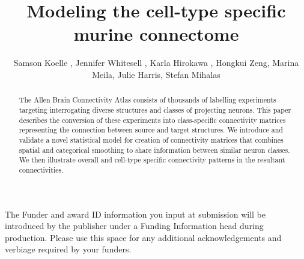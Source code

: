 \documentclass[NETN,manuscript]{stjour-new}
\begin{document}



\title{Modeling the cell-type specific murine connectome}

\author[Koelle et al]%
{Samson Koelle , Jennifer Whitesell , Karla Hirokawa ,  Hongkui Zeng, Marina Meila, Julie Harris, Stefan Mihalas}





\begin{abstract}

The Allen Brain Connectivity Atlas consists of thousands of labelling experiments targeting interrogating diverse structures and classes of projecting neurons.
This paper describes the conversion of these experiments into class-specific connectivity matrices representing the connection between source and target structures.
We introduce and validate a novel statistical model for creation of connectivity matrices that combines spatial and categorical smoothing to share information between similar neuron classes.
We then illustrate overall and cell-type specific connectivity patterns in the resultant connectivities.

\end{abstract}

\begin{authorsummary}
\end{authorsummary}







\acknowledgments
The Funder and award ID information you input at submission will be introduced by the publisher under a Funding Information head during production. 
Please use this space for any additional acknowledgements and verbiage required by your funders.
\end{document}
